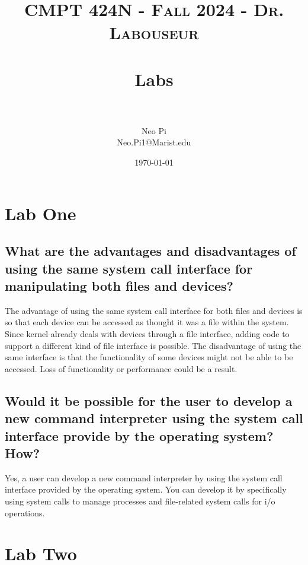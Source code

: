 \documentclass[letterpaper, 10pt,DIV=13]{scrartcl}
\title{	
   \normalfont \normalsize 
   \textsc{CMPT 424N - Fall 2024 - Dr. Labouseur} \\[10pt] %
   \horrule{0.5pt} \\[0.25cm] 	%
   \huge Labs  \\     	    %
   \horrule{0.5pt} \\[0.25cm] 	%
}
\author{Neo Pi \\ \normalsize Neo.Pi1@Marist.edu}
\date{\normalsize\today} 	%
\numberwithin{equation}{section} %
\numberwithin{figure}{section} %
\numberwithin{table}{section} %
\begin{document}
\maketitle %

\section{Lab One}

\subsection{What are the advantages and disadvantages of using the same system call interface for manipulating both files and devices?}
The advantage of using the same system call interface for both files and devices is so that each device can be accessed as thought it was a file within the system. Since kernel already deals with devices through a file interface, adding code to support a different kind of file interface is possible. 
The disadvantage of using the same interface is that the functionality of some devices might not be able to be accessed. Loss of functionality or performance could be a result.

\subsection{Would it be possible for the user to develop a new command interpreter using the system call interface provide by the operating system? How?}
Yes, a user can develop a new command interpreter by using the system call interface provided by the operating system.
You can develop it by specifically using system calls to manage processes and file-related system calls for i/o operations. 


\section{Lab Two}


\pagebreak

\end{document}
